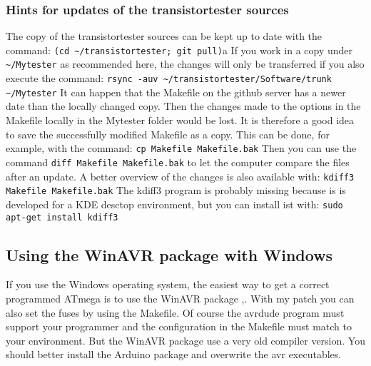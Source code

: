 \subsubsection{Hints for updates of the transistortester sources}
The copy of the transistortester sources can be kept up to date with the command:
\large{\newline\verb"(cd ~/transistortester; git pull)"a\newline}
If you work in a copy under \verb "~/Mytester" as recommended here,
the changes will only be transferred if you also execute the command:
\large{\newline\verb "rsync -auv ~/transistortester/Software/trunk ~/Mytester"\newline}
It can happen that the Makefile on the github server has a newer date than
the locally changed copy.
Then the changes made to the options in the Makefile locally in the Mytester folder would be lost.
It is therefore a good idea to save the successfully modified Makefile as a copy.
This can be done, for example, with the command:
\large{\newline\verb"cp Makefile Makefile.bak"\newline}
Then you can use the command
\large{\newline\verb"diff Makefile Makefile.bak"\newline}
to let the computer compare the files after an update.
A better overview of the changes is also available with:
\large{\newline\verb"kdiff3 Makefile Makefile.bak"\newline}
The kdiff3 program is probably missing because is is developed for a
KDE desctop environment, but you can install ist with:
\large{\newline\verb"sudo apt-get install kdiff3"\newline}

\subsection{Using the WinAVR package with Windows}
If you use the Windows operating system, the easiest way to get a correct programmed
ATmega is to use the WinAVR package \cite{winavr1},\cite{winavr2}.
With my patch \cite{winavr3} you can also set the fuses by using the Makefile.
Of course the avrdude program must support your programmer and the configuration
in the Makefile must match to your environment.
But the WinAVR package use a very old compiler version. You should better install
the Arduino package and overwrite the avr executables.

